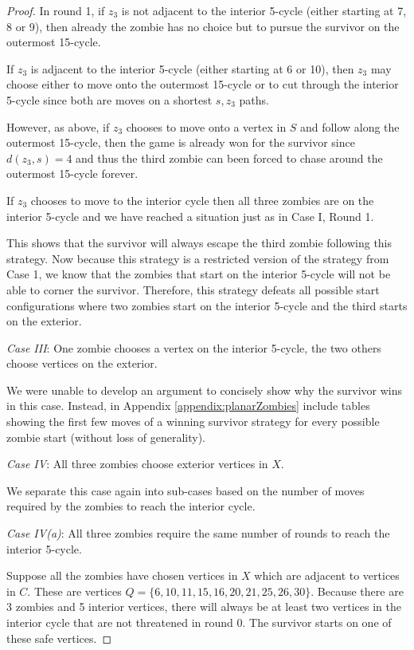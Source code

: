 \begin{proof}
In round 1, if $z_3$ is not adjacent to the interior 5-cycle (either starting at 7, 8 or 9), then already the zombie has no choice but to pursue the survivor
on the outermost 15-cycle.

If $z_3$ is adjacent to the interior 5-cycle (either starting at 6 or 10), then $z_3$ may choose either to move onto the outermost 15-cycle or to cut through the interior 5-cycle since both are moves on a shortest $s,z_3$ paths.

However, as above, if $z_3$ chooses to move onto a vertex in $S$ and follow along the outermost 15-cycle, then the game is already won for the survivor since
$d(z_3, s) = 4$ and thus the third zombie can been forced to chase around the outermost 15-cycle forever.

If $z_3$ chooses to move to the interior cycle then all three zombies are on the interior 5-cycle and we have reached a situation just as in Case I, Round 1.

This shows that the survivor will always escape the third zombie following this strategy. Now because this strategy is a restricted version of the strategy from
Case 1, we know that the zombies that start on the interior 5-cycle will not be able to corner the survivor. Therefore, this strategy defeats all possible
start configurations where two zombies start on the interior 5-cycle and the third starts on the exterior.

\textit{Case III}: One zombie chooses a vertex on the interior 5-cycle, the two others choose vertices on the exterior.

We were unable to develop an argument to concisely show why the survivor wins in this case.
Instead, in Appendix \ref{appendix:planarZombies} include tables showing the first few moves of a winning survivor strategy
for every possible zombie start (without loss of generality).

\textit{Case IV}: All three zombies choose exterior vertices in $X$.

We separate this case again into sub-cases based on the number of moves required
by the zombies to reach the interior cycle.

\textit{Case IV(a)}: All three zombies require the same number of rounds to reach the interior 5-cycle.

Suppose all the zombies have chosen vertices in $X$ which are adjacent to vertices in $C$. These are vertices $Q = \{6, 10, 11, 15, 16, 20, 21, 25, 26, 30 \}$.
Because there are 3 zombies and 5 interior vertices, there will always be at least two vertices in the interior cycle that are not threatened in
round 0. The survivor starts on one of these safe vertices.


\end{proof}
